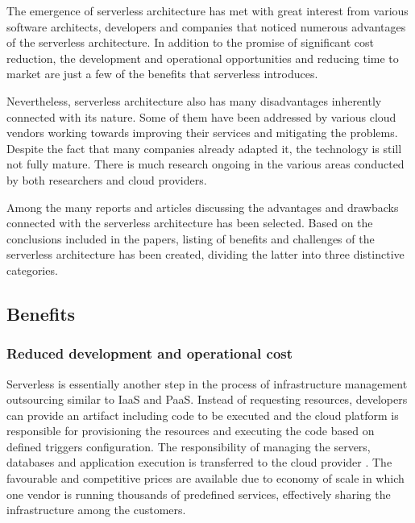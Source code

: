 The emergence of serverless architecture has met with great interest from various software architects, developers and companies that noticed numerous advantages of the serverless architecture. In addition to the promise of significant cost reduction, the development and operational opportunities and reducing time to market are just a few of the benefits that serverless introduces.

Nevertheless, serverless architecture also has many disadvantages inherently connected with its nature. Some of them have been addressed by various cloud vendors working towards improving their services and mitigating the problems. Despite the fact that many companies already adapted it, the technology is still not fully mature. There is much research ongoing in the various areas conducted by both researchers and cloud providers.

Among the many reports and articles discussing the advantages and drawbacks connected with the serverless architecture \cite{MartinFowlerServerless} \cite{BerkeleyServerless} \cite{ServerlessComputingSurveyOfOpportunitiesChallengesApplications} \cite{LeveragingServerlessCloudComputingArchitectures} has been selected. Based on the conclusions included in the papers, listing of benefits and challenges of the serverless architecture has been created, dividing the latter into three distinctive categories.

\subsection{Benefits}

\subsubsection*{Reduced development and operational cost}

Serverless is essentially another step in the process of infrastructure management outsourcing similar to IaaS and PaaS. Instead of requesting resources, developers can provide an artifact including code to be executed and the cloud platform is responsible for provisioning the resources and executing the code based on defined triggers configuration. The responsibility of managing the servers, databases and application execution is transferred to the cloud provider \cite{BerkeleyServerless}. The favourable and competitive prices are available due to economy of scale in which one vendor is running thousands of predefined services, effectively sharing the infrastructure among the customers.

